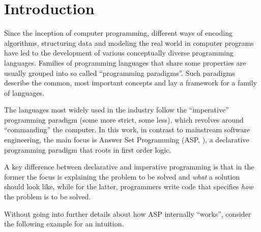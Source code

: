 \documentclass{vutinfth} %
\begin{document}

\tableofcontents %

\mainmatter

\chapter{Introduction}
\label{chap:intro}

Since the inception of computer programming, different ways of encoding algorithms, structuring data and modeling the real world in computer programs have led to the development of various conceptually diverse programming languages. Families of programming languages that share some properties are usually grouped into so called \enquote{programming paradigms}.
Such paradigms describe the common, most important concepts and lay a framework for a family of languages.

The languages most widely used in the industry follow the \enquote{imperative} programming paradigm (some more strict, some less), which revolves around \enquote{commanding} the computer. In this work, in contrast to mainstream software engineering, the main focus is Answer Set Programming (ASP, \cite{stable}), a declarative programming paradigm that roots in first order logic.

A key difference between declarative and imperative programming is that in the former the focus is explaining the problem to be solved and \emph{what} a solution should look like, while for the latter, programmers write code that specifies \emph{how} the problem is to be solved.

Without going into further details about how ASP internally \enquote{works}, consider the following example for an intuition.
\end{document}
